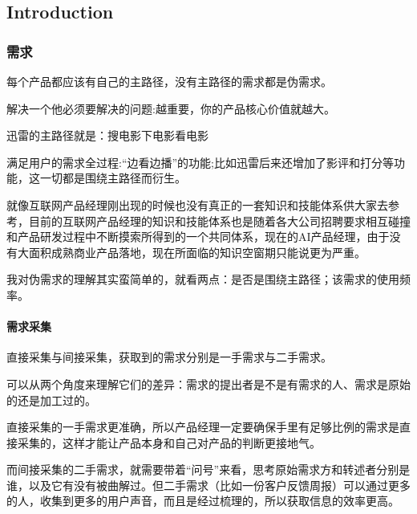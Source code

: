 \documentclass[letterpaper,11pt,english]{sphinxmanual}
\begin{document}
\subsection{Introduction}
\label{\detokenize{chapter_introduction/index:introduction}}\label{\detokenize{chapter_introduction/index:chap-intro}}\label{\detokenize{chapter_introduction/index::doc}}

\subsubsection{需求}
\label{\detokenize{chapter_introduction/need:id1}}\label{\detokenize{chapter_introduction/need::doc}}
每个产品都应该有自己的主路径，没有主路径的需求都是伪需求。%
\begin{footnote}[2]\sphinxAtStartFootnote
{}
%
\end{footnote}

解决一个他必须要解决的问题:越重要，你的产品核心价值就越大。

迅雷的主路径就是：搜电影\sphinxhyphen{}下电影\sphinxhyphen{}看电影

满足用户的需求全过程:“边看边播”的功能;比如迅雷后来还增加了影评和打分等功能，这一切都是围绕主路径而衍生。

就像互联网产品经理刚出现的时候也没有真正的一套知识和技能体系供大家去参考，目前的互联网产品经理的知识和技能体系也是随着各大公司招聘要求相互碰撞和产品研发过程中不断摸索所得到的一个共同体系，现在的AI产品经理，由于没有大面积成熟商业产品落地，现在所面临的知识空窗期只能说更为严重。

我对伪需求的理解其实蛮简单的，就看两点：是否是围绕主路径；该需求的使用频率。


\paragraph{需求采集}
\label{\detokenize{chapter_introduction/need:id2}}
直接采集与间接采集，获取到的需求分别是一手需求与二手需求。

可以从两个角度来理解它们的差异：需求的提出者是不是有需求的人、需求是原始的还是加工过的。

直接采集的一手需求更准确，所以产品经理一定要确保手里有足够比例的需求是直接采集的，这样才能让产品本身和自己对产品的判断更接地气。

而间接采集的二手需求，就需要带着“问号”来看，思考原始需求方和转述者分别是谁，以及它有没有被曲解过。但二手需求（比如一份客户反馈周报）可以通过更多的人，收集到更多的用户声音，而且是经过梳理的，所以获取信息的效率更高。
\end{document}
